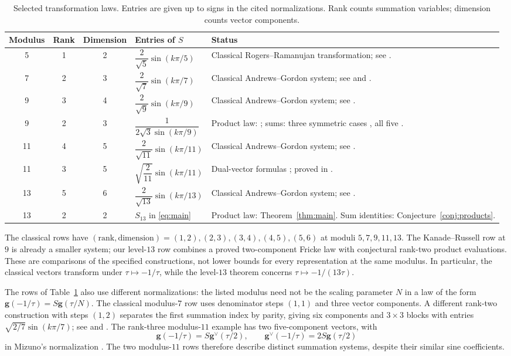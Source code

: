 \documentclass[11pt,reqno]{amsart}
\theoremstyle{remark}
\numberwithin{equation}{section}
\begin{document}
\begin{table}[H]
\caption{Selected transformation laws. Entries are given up to signs in
the cited normalizations. Rank counts summation variables; dimension
counts vector components.}\label{tab:transforms}
\centering\small
\renewcommand{\arraystretch}{1.35}
\begin{tabularx}{\textwidth}{@{}cccl>{\raggedright\arraybackslash}X@{}}\toprule
Modulus&Rank&Dimension&Entries of $S$&Status\\\midrule
5&1&2&$\dfrac2{\sqrt5}\sin(k\pi/5)$&Classical Rogers--Ramanujan transformation; see \cite{Mizuno,WangZhang}.\\
7&2&3&$\dfrac2{\sqrt7}\sin(k\pi/7)$&Classical Andrews--Gordon system; see \cite{Andrews} and \cite[Section~1.3]{Ono}.\\
9&3&4&$\dfrac2{\sqrt9}\sin(k\pi/9)$&Classical Andrews--Gordon system; see \cite{Andrews,Ono}.\\
9&2&3&$\dfrac1{2\sqrt3\sin(k\pi/9)}$&Product law: \cite{WangZhang}; sums: three symmetric cases \cite{MizunoKR}, all five \cite{Xia}.\\
11&4&5&$\dfrac2{\sqrt{11}}\sin(k\pi/11)$&Classical Andrews--Gordon system; see \cite[Section~4]{Ono}.\\
11&3&5&$\sqrt{\dfrac2{11}}\sin(k\pi/11)$&Dual-vector formulas \cite[(54)]{Mizuno}; proved in \cite[Theorem~1.6]{WangWang3}.\\
13&5&6&$\dfrac2{\sqrt{13}}\sin(k\pi/13)$&Classical Andrews--Gordon system; see \cite{Andrews,Ono}.\\
13&2&2&$S_{13}$ in \eqref{eq:main}&Product law: Theorem~\ref{thm:main}. Sum identities: Conjecture~\ref{conj:products}.\\\bottomrule
\end{tabularx}
\end{table}

The classical rows have $(\text{rank},\text{dimension})=(1,2),(2,3),
(3,4),(4,5),(5,6)$ at moduli $5,7,9,11,13$. The Kanade--Russell row at
$9$ is already a smaller system; our level-$13$ row combines a proved
two-component Fricke law with conjectural rank-two product evaluations.
These are comparisons of the specified constructions, not lower bounds
for every representation at the same modulus. In particular, the
classical vectors transform under $\tau\mapsto-1/\tau$, while the
level-$13$ theorem concerns $\tau\mapsto-1/(13\tau)$.

The rows of Table~\ref{tab:transforms} also use different normalizations: the
listed modulus need not be the scaling parameter $N$ in a law of the form
$\mathbf g(-1/\tau)=S\mathbf g(\tau/N)$. The classical modulus-$7$ row
uses denominator steps $(1,1)$ and three vector components. A different
rank-two construction with steps $(1,2)$ separates the first summation
index by parity, giving six components and $3\times3$ blocks with entries
$\sqrt{2/7}\sin(k\pi/7)$; see \cite[(42)--(46)]{Mizuno} and
\cite[Theorem~1.3]{WangWang2}. The rank-three modulus-$11$ example has
two five-component vectors, with
\[
 \mathbf g(-1/\tau)=S\mathbf g^\vee(\tau/2),\qquad
 \mathbf g^\vee(-1/\tau)=2S\mathbf g(\tau/2)
\]
in Mizuno's normalization \cite[(54)]{Mizuno}. The two modulus-$11$ rows
therefore describe distinct summation systems, despite their similar sine
coefficients.
\end{document}
